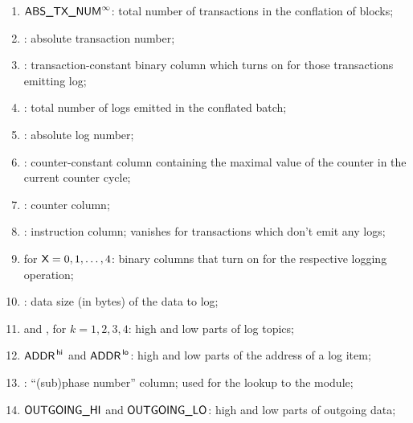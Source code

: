\begin{enumerate}
	\item $\textsf{ABS\_TX\_NUM}^\infty$: total number of transactions in the conflation of blocks;
	\item \absTxNum{}: absolute transaction number;
	\item \txEmitsLogs{}: transaction-constant binary column which turns on for those transactions emitting log; 
	\item \absLogNumMax{}: total number of logs emitted in the conflated batch;
	\item \absLogNum{}: absolute log number;
	\item \maxCt{}: counter-constant column containing the maximal value of the counter in the current counter cycle;
	\item \ct{}: counter column;
	\item \INST: instruction column; vanishes for transactions which don't emit any logs;
	\item {} for $\textsf{X} = 0, 1, \dots, 4$: binary columns that turn on for the respective logging operation; 
	\item \logDataSize{}: data size (in bytes) of the data to log;
	\item {} and , for $k = 1, 2, 3, 4$: high and low parts of log topics; 
	\item $\textsf{ADDR}^{\mathsf{\,hi}}$ and $\textsf{ADDR}^{\mathsf{\,lo}}$: high and low parts of the address of a log item;
	\item \phaseNum{}: ``(sub)phase number'' column; used for the lookup to the \rlpTxnRcptMod{} module; 
	\item $\textsf{OUTGOING}\textsf{\_HI}{}$ and $\textsf{OUTGOING}\textsf{\_LO}{}$: high and low parts of outgoing data;
\end{enumerate}
